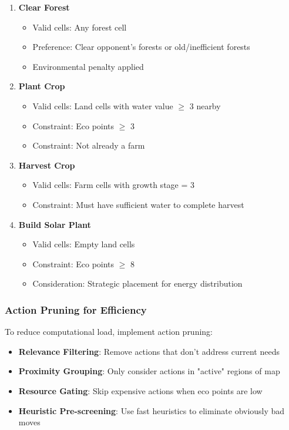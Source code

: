 \documentclass[12pt,a4paper]{article}
\begin{document}
\begin{enumerate}
    \item \textbf{Clear Forest}
    \begin{itemize}
        \item Valid cells: Any forest cell
        \item Preference: Clear opponent's forests or old/inefficient forests
        \item Environmental penalty applied
    \end{itemize}
    
    \item \textbf{Plant Crop}
    \begin{itemize}
        \item Valid cells: Land cells with water value $\geq$ 3 nearby
        \item Constraint: Eco points $\geq$ 3
        \item Constraint: Not already a farm
    \end{itemize}
    
    \item \textbf{Harvest Crop}
    \begin{itemize}
        \item Valid cells: Farm cells with growth stage = 3
        \item Constraint: Must have sufficient water to complete harvest
    \end{itemize}
    
    \item \textbf{Build Solar Plant}
    \begin{itemize}
        \item Valid cells: Empty land cells
        \item Constraint: Eco points $\geq$ 8
        \item Consideration: Strategic placement for energy distribution
    \end{itemize}
\end{enumerate}

\subsubsection{Action Pruning for Efficiency}

To reduce computational load, implement action pruning:

\begin{itemize}
    \item \textbf{Relevance Filtering}: Remove actions that don't address current needs
    \item \textbf{Proximity Grouping}: Only consider actions in "active" regions of map
    \item \textbf{Resource Gating}: Skip expensive actions when eco points are low
    \item \textbf{Heuristic Pre-screening}: Use fast heuristics to eliminate obviously bad moves
\end{itemize}
\end{document}
